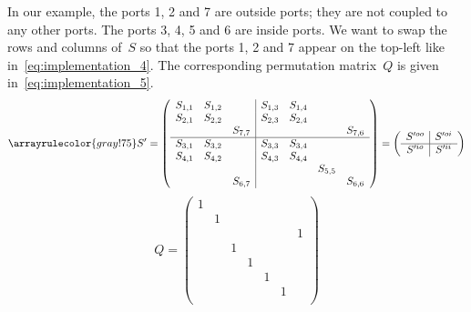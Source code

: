 In our example, the ports 1, 2 and 7 are outside ports; they are not coupled to any other ports.
The ports 3, 4, 5 and 6 are inside ports.
We want to swap the rows and columns of~$S$ so that the ports 1, 2 and 7 appear on the top-left like in~\cref{eq:implementation_4}.
The corresponding permutation matrix~$Q$ is given in~\cref{eq:implementation_5}.
\begin{equation}
    \arrayrulecolor{gray!75}
    S' =
    \left(
    \begin{array}{ccc|cccc}
        S_{1,1} & S_{1,2} &         & S_{1,3} & S_{1,4} &         &         \\
        S_{2,1} & S_{2,2} &         & S_{2,3} & S_{2,4} &         &         \\
                &         & S_{7,7} &         &         &         & S_{7,6} \\
                \hline
        S_{3,1} & S_{3,2} &         & S_{3,3} & S_{3,4} &         &         \\
        S_{4,1} & S_{4,2} &         & S_{4,3} & S_{4,4} &         &         \\
                &         &         &         &         & S_{5,5} &         \\
                &         & S_{6,7} &         &         &         & S_{6,6} \\
    \end{array}
    \right)
    =
    \left(
    \begin{array}{c|c}
        S'^{oo} & S'^{oi} \\
        \hline
        S'^{io} & S'^{ii} \\
    \end{array}
    \right)
    \label{eq:implementation_4}
\end{equation}
\begin{equation}
    Q =
    \begin{pmatrix}
        1  &     &     &     &     &     &     \\
           &  1  &     &     &     &     &     \\
           &     &     &     &     &     &  1  \\
           &     &  1  &     &     &     &     \\
           &     &     &  1  &     &     &     \\
           &     &     &     &  1  &     &     \\
           &     &     &     &     &  1  &     \\
    \end{pmatrix}
    \label{eq:implementation_5}
\end{equation}


